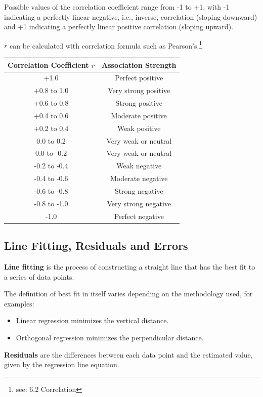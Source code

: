 \documentclass{article}
\begin{document}
Possible values of the correlation coefficient range from -1 to +1, with -1 indicating a perfectly linear negative, i.e., inverse, correlation (sloping downward) and +1 indicating a perfectly linear positive correlation (sloping upward).

$r$ can be calculated with correlation formula such as Pearson's.\footnote{see: 6.2 Correlation}

\begin{center}
\begin{tabular}{|c|c|}
\hline
Correlation Coefficient $r$ & Association Strength \\ \hline
+1.0 & Perfect positive \\ \hline
+0.8 to 1.0 & Very strong positive \\ \hline
+0.6 to 0.8 & Strong positive \\ \hline
+0.4 to 0.6 & Moderate positive \\ \hline
+0.2 to 0.4 & Weak positive \\ \hline
0.0 to 0.2 & Very weak or neutral \\ \hline
0.0 to -0.2 & Very weak or neutral \\ \hline
-0.2 to -0.4 & Weak negative \\ \hline
-0.4 to -0.6 & Moderate negative \\ \hline
-0.6 to -0.8 & Strong negative \\ \hline
-0.8 to -1.0 & Very strong negative \\ \hline
-1.0  & Perfect negative \\
\hline
\end{tabular}
\end{center}

\subsection{Line Fitting, Residuals and Errors}
\textbf{Line fitting} is the process of constructing a straight line that has the best fit to a series of data points.

The definition of best fit in itself varies depending on the methodology used, for examples:
\begin{itemize}
    \item Linear regression minimizes the vertical distance.
    \item Orthogonal regression minimizes the perpendicular distance.
\end{itemize}

\textbf{Residuals} are the differences between each data point and the estimated value, given by the regression line equation.
\end{document}
